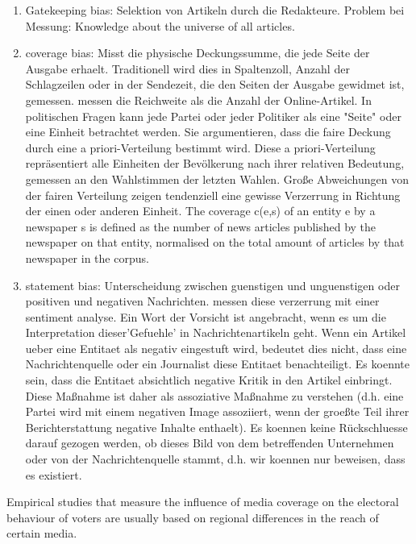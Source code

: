 \documentclass[12pt,a4paper,notitlepage]{article}
\begin{document}
\begin{enumerate}
	\item Gatekeeping bias: Selektion von Artikeln durch die Redakteure. Problem bei Messung: Knowledge about the universe of all articles.
	\item coverage bias: Misst die physische Deckungssumme, die jede Seite der Ausgabe erhaelt. Traditionell wird dies in Spaltenzoll, Anzahl der Schlagzeilen oder in der Sendezeit, die den Seiten der Ausgabe gewidmet ist, gemessen. \citet{junque_de_fortuny_media_2012} messen die Reichweite als die Anzahl der Online-Artikel. In politischen Fragen kann jede Partei oder jeder Politiker als eine "Seite" oder eine Einheit betrachtet werden. Sie argumentieren, dass die faire Deckung durch eine a priori-Verteilung bestimmt wird. Diese a priori-Verteilung repräsentiert alle Einheiten der Bevölkerung nach ihrer relativen Bedeutung, gemessen an den Wahlstimmen der letzten Wahlen. Große Abweichungen von der fairen Verteilung zeigen tendenziell eine gewisse Verzerrung in Richtung der einen oder anderen Einheit. The coverage c(e,s) of an entity e by a newspaper s is defined as the number of news articles published by the newspaper on that entity, normalised on the total amount of articles by that newspaper in the corpus.
	\item statement bias: Unterscheidung zwischen guenstigen und unguenstigen oder positiven und negativen Nachrichten. \citet{junque_de_fortuny_media_2012} messen diese verzerrung mit einer sentiment analyse. Ein Wort der Vorsicht ist angebracht, wenn es um die Interpretation dieser'Gefuehle' in Nachrichtenartikeln geht. Wenn ein Artikel ueber eine Entitaet als negativ eingestuft wird, bedeutet dies nicht, dass eine Nachrichtenquelle oder ein Journalist diese Entitaet benachteiligt. Es koennte sein, dass die Entitaet absichtlich negative Kritik in den Artikel einbringt. Diese Maßnahme ist daher als assoziative Maßnahme zu verstehen (d.h. eine Partei wird mit einem negativen Image assoziiert, wenn der groeßte Teil ihrer Berichterstattung negative Inhalte enthaelt). Es koennen keine Rückschluesse darauf gezogen werden, ob dieses Bild von dem betreffenden Unternehmen oder von der Nachrichtenquelle stammt, d.h. wir koennen nur beweisen, dass es existiert.
\end{enumerate}


Empirical studies that measure the influence of media coverage on the electoral behaviour of voters are usually based on regional differences in the reach of certain media.  
\end{document}
